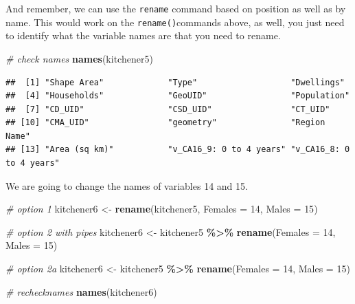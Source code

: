 \documentclass[
]{article}
\newenvironment{Shaded}{\begin{snugshade}}{\end{snugshade}}
\newcommand{\CommentTok}[1]{\textcolor[rgb]{0.56,0.35,0.01}{\textit{#1}}}
\newcommand{\DataTypeTok}[1]{\textcolor[rgb]{0.13,0.29,0.53}{#1}}
\newcommand{\DecValTok}[1]{\textcolor[rgb]{0.00,0.00,0.81}{#1}}
\newcommand{\KeywordTok}[1]{\textcolor[rgb]{0.13,0.29,0.53}{\textbf{#1}}}
\newcommand{\NormalTok}[1]{#1}
\newcommand{\OperatorTok}[1]{\textcolor[rgb]{0.81,0.36,0.00}{\textbf{#1}}}
\newcommand{\StringTok}[1]{\textcolor[rgb]{0.31,0.60,0.02}{#1}}
\begin{document}
And remember, we can use the \texttt{rename} command based on position
as well as by name. This would work on the \texttt{rename()}commands
above, as well, you just need to identify what the variable names are
that you need to rename.

\begin{Shaded}
\begin{Highlighting}[]
\CommentTok{\# check names}
\KeywordTok{names}\NormalTok{(kitchener5)}
\end{Highlighting}
\end{Shaded}

\begin{verbatim}
##  [1] "Shape Area"             "Type"                   "Dwellings"             
##  [4] "Households"             "GeoUID"                 "Population"            
##  [7] "CD_UID"                 "CSD_UID"                "CT_UID"                
## [10] "CMA_UID"                "geometry"               "Region Name"           
## [13] "Area (sq km)"           "v_CA16_9: 0 to 4 years" "v_CA16_8: 0 to 4 years"
\end{verbatim}

We are going to change the names of variables 14 and 15.

\begin{Shaded}
\begin{Highlighting}[]
\CommentTok{\# option 1}
\NormalTok{kitchener6 <{-}}\StringTok{ }\KeywordTok{rename}\NormalTok{(kitchener5, }\DataTypeTok{Females =} \DecValTok{14}\NormalTok{, }\DataTypeTok{Males =} \DecValTok{15}\NormalTok{)}

\CommentTok{\# option 2 with pipes}
\NormalTok{kitchener6 <{-}}\StringTok{ }\NormalTok{kitchener5 }\OperatorTok{\%>\%}\StringTok{ }\KeywordTok{rename}\NormalTok{(}\DataTypeTok{Females =} \DecValTok{14}\NormalTok{, }\DataTypeTok{Males =} \DecValTok{15}\NormalTok{)}

\CommentTok{\# option 2a}
\NormalTok{kitchener6 <{-}}\StringTok{ }\NormalTok{kitchener5 }\OperatorTok{\%>\%}\StringTok{ }\KeywordTok{rename}\NormalTok{(}\DataTypeTok{Females =} \DecValTok{14}\NormalTok{, }\DataTypeTok{Males =} \DecValTok{15}\NormalTok{)}
\end{Highlighting}
\end{Shaded}

\begin{Shaded}
\begin{Highlighting}[]
\CommentTok{\# rechecknames}
\KeywordTok{names}\NormalTok{(kitchener6)}
\end{Highlighting}
\end{Shaded}
\end{document}
